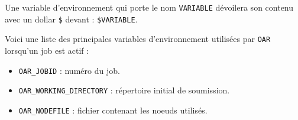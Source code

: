 \par Une variable d'environnement qui porte le nom \texttt{VARIABLE} dévoilera son contenu avec un dollar \texttt{\$} devant : \texttt{\$VARIABLE}.

\par Voici une liste des principales variables d'environnement utilisées par \texttt{OAR} lorsqu'un job est actif :
\begin{itemize}
\item \texttt{OAR\_JOBID} : numéro du job.
\item \texttt{OAR\_WORKING\_DIRECTORY} : répertoire initial de soumission.
\item \texttt{OAR\_NODEFILE} : fichier contenant les noeuds utilisés. 
\end{itemize}


